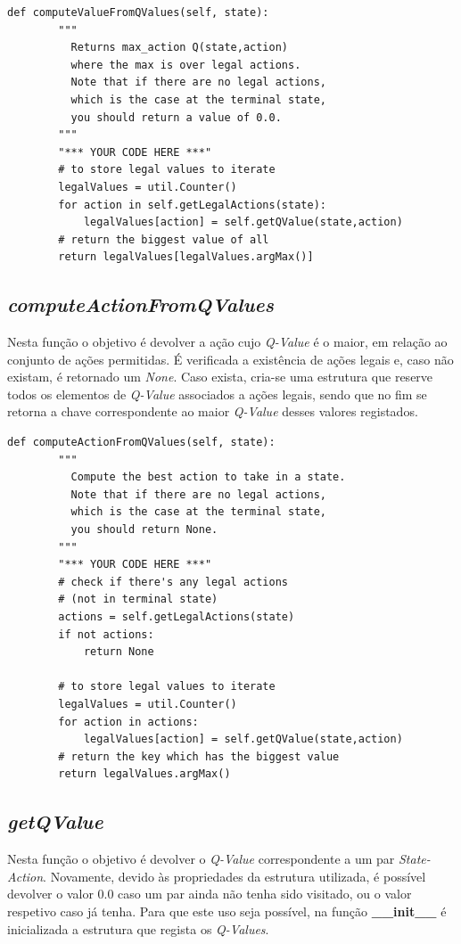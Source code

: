 \documentclass[runningheads]{article}
\begin{document}
\begin{verbatim}
def computeValueFromQValues(self, state):
        """
          Returns max_action Q(state,action)
          where the max is over legal actions.
          Note that if there are no legal actions,
          which is the case at the terminal state,
          you should return a value of 0.0.
        """
        "*** YOUR CODE HERE ***"
        # to store legal values to iterate
        legalValues = util.Counter()
        for action in self.getLegalActions(state):
            legalValues[action] = self.getQValue(state,action)
        # return the biggest value of all
        return legalValues[legalValues.argMax()]
\end{verbatim}

\newpage
\subsection{\textit{computeActionFromQValues}}
Nesta função o objetivo é devolver a ação cujo \textit{Q-Value} é o maior, em relação ao conjunto de ações permitidas. É verificada a existência de ações legais e, caso não existam, é retornado um \textit{None}. Caso exista, cria-se uma estrutura que reserve todos os elementos de \textit{Q-Value} associados a ações legais, sendo que no fim se retorna a chave correspondente ao maior \textit{Q-Value} desses valores registados.

\begin{verbatim}
def computeActionFromQValues(self, state):
        """
          Compute the best action to take in a state.
          Note that if there are no legal actions,
          which is the case at the terminal state,
          you should return None.
        """
        "*** YOUR CODE HERE ***"
        # check if there's any legal actions
        # (not in terminal state)
        actions = self.getLegalActions(state)
        if not actions:
            return None

        # to store legal values to iterate
        legalValues = util.Counter()
        for action in actions:
            legalValues[action] = self.getQValue(state,action)
        # return the key which has the biggest value
        return legalValues.argMax()
\end{verbatim}

\subsection{\textit{getQValue}}
Nesta função o objetivo é devolver o \textit{Q-Value} correspondente a um par \textit{State-Action}. Novamente, devido às propriedades da estrutura utilizada, é possível devolver o valor 0.0 caso um par ainda não tenha sido visitado, ou o valor respetivo caso já tenha. Para que este uso seja possível, na função \textbf{\_\_init\_\_} é inicializada a estrutura que regista os \textit{Q-Values}.
\end{document}
